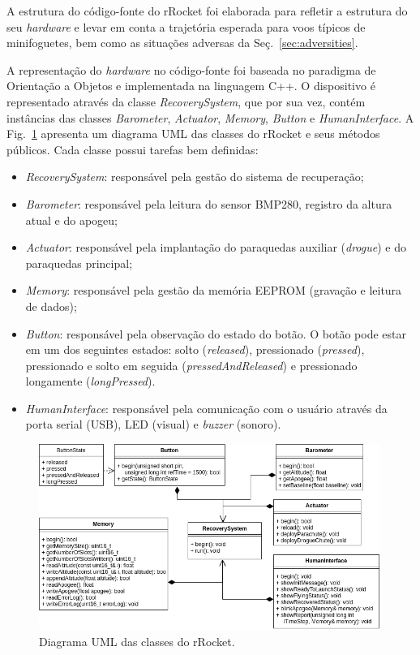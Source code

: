 \documentclass[12pt,a4paper]{article}
\begin{document}
A estrutura do código-fonte do rRocket foi elaborada para refletir a estrutura do seu \textit{hardware} e levar em conta a trajetória esperada para voos típicos de minifoguetes, bem como as situações adversas da Seç.~\ref{sec:adversities}.

A representação do \textit{hardware} no código-fonte foi baseada no paradigma de Orientação a Objetos e implementada na linguagem C++. O dispositivo é representado através da classe \textit{RecoverySystem}, que por sua vez, contém instâncias das classes \textit{Barometer}, \textit{Actuator}, \textit{Memory}, \textit{Button} e \textit{HumanInterface}. A Fig.~\ref{fig:uml} apresenta um diagrama UML das classes do rRocket e seus métodos públicos.
Cada classe possui tarefas bem definidas:
\begin{itemize}
	\item \textit{RecoverySystem}: responsável pela gestão do sistema de recuperação;
	\item \textit{Barometer}: responsável pela leitura do sensor BMP280, registro da altura atual e do apogeu;
	\item \textit{Actuator}: responsável pela implantação do paraquedas auxiliar (\textit{drogue}) e do paraquedas principal;
	\item \textit{Memory}: responsável pela gestão da memória EEPROM (gravação e leitura de dados);
	\item \textit{Button}: responsável pela observação do estado do botão. O botão pode estar em um dos seguintes estados: solto (\textit{released}), pressionado (\textit{pressed}), pressionado e solto em seguida (\textit{pressedAndReleased}) e pressionado longamente (\textit{longPressed}).
	\item \textit{HumanInterface}: responsável pela comunicação com o usuário através da porta serial (USB), LED (visual) e \textit{buzzer} (sonoro).
\end{itemize}

\begin{figure}[!ht]
	\centering
	\includegraphics[width=0.99\textwidth]{./fig/RecoverySystem}
	\caption{Diagrama UML das classes do rRocket.}
	\label{fig:uml}
\end{figure}
\end{document}
